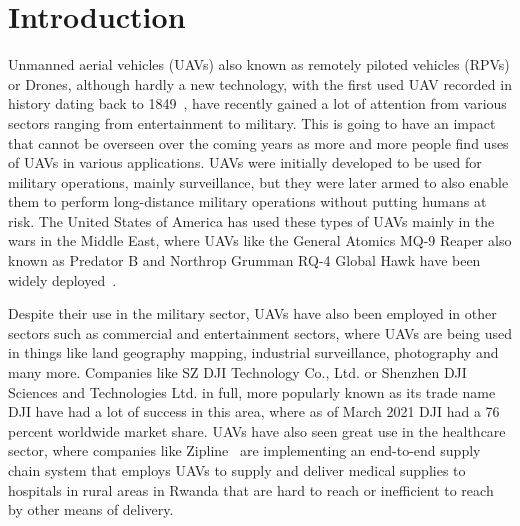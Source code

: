 

\chapter{Introduction}
\label{chap:thesis-introduction}

Unmanned aerial vehicles (UAVs) also known as remotely piloted vehicles (RPVs) or Drones, although hardly a new technology, with the first used UAV recorded in history dating back to 1849~\cite{vasileprisacariujdrm2017}, have recently gained a lot of attention from various sectors ranging from entertainment to military. This is going to have an impact that cannot be overseen over the coming years as more and more people find uses of UAVs in various applications. UAVs were initially developed to be used for military operations, mainly surveillance, but they were later armed to also enable them to perform long-distance military operations without putting humans at risk. The United States of America has used these types of UAVs mainly in the wars in the Middle East, where UAVs like the General Atomics MQ-9 Reaper also known as Predator B and Northrop Grumman RQ-4 Global Hawk have been widely deployed~\cite{samaanorientxxi2022}.

Despite their use in the military sector, UAVs have also been employed in other sectors such as commercial and entertainment sectors, where UAVs are being used in things like land geography mapping, industrial surveillance, photography and many more. Companies like SZ DJI Technology Co., Ltd. or Shenzhen DJI Sciences and Technologies Ltd. in full, more popularly known as its trade name DJI have had a lot of success in this area, where as of March 2021 DJI had a 76 percent worldwide market share\cite{djimarketshare2021}. UAVs have also seen great use in the healthcare sector, where companies like Zipline~\cite{droneslevy2022} are implementing an end-to-end supply chain system that employs UAVs to supply and deliver medical supplies to hospitals in rural areas in Rwanda that are hard to reach or inefficient to reach by other means of delivery.

